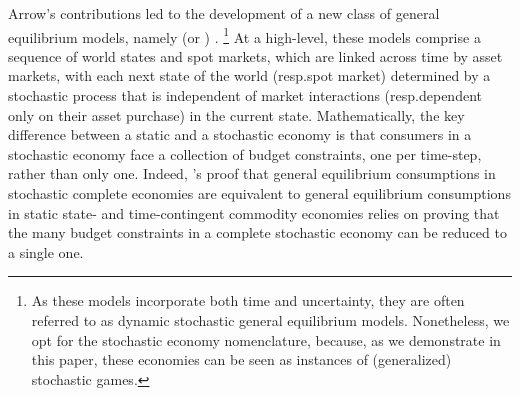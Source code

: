 Arrow's contributions led to the development of a new class of general equilibrium models, namely  (or ) \cite{geanakoplos1990introduction}.%
\footnote{As these models incorporate both time and uncertainty, they are often referred to as dynamic stochastic general equilibrium models.
Nonetheless, we opt for the stochastic economy nomenclature, because, as we 
demonstrate in this paper, these economies can be seen as instances of (generalized) stochastic games.}
At a high-level, these models comprise a sequence of world states and spot markets,
which are linked across time by
asset markets, with each next state of the world (resp.\@ spot market) determined by a stochastic process that is independent of market interactions (resp.\@ dependent only on their asset purchase) in the current state. 
Mathematically, the key difference between a static and a stochastic economy is that consumers in a stochastic economy face a collection of budget constraints, one per time-step, rather than only one.
Indeed, \citet{arrow1964role}'s proof that general equilibrium consumptions in stochastic complete economies are equivalent to general equilibrium consumptions in static state- and time-contingent commodity economies relies on proving that the many budget constraints in a complete stochastic economy can be reduced to a single one.

